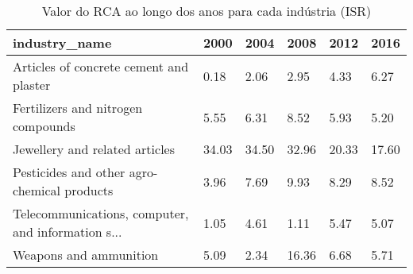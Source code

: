 \begin{table}
\centering
\caption{Valor do RCA ao longo dos anos para cada indústria (ISR)}
\begin{tabular}{p{6cm}p{1.5cm}p{1.5cm}p{1.5cm}p{1.5cm}p{1.5cm}}
\toprule
                                     industry\_name &  2000 &  2004 &  2008 &  2012 &  2016 \\
\midrule
           Articles of concrete cement and plaster &  0.18 &  2.06 &  2.95 &  4.33 &  6.27 \\
                Fertilizers and nitrogen compounds &  5.55 &  6.31 &  8.52 &  5.93 &  5.20 \\
                    Jewellery and related articles & 34.03 & 34.50 & 32.96 & 20.33 & 17.60 \\
       Pesticides and other agro-chemical products &  3.96 &  7.69 &  9.93 &  8.29 &  8.52 \\
Telecommunications, computer, and information s... &  1.05 &  4.61 &  1.11 &  5.47 &  5.07 \\
                            Weapons and ammunition &  5.09 &  2.34 & 16.36 &  6.68 &  5.71 \\
\bottomrule
\end{tabular}
\end{table}
